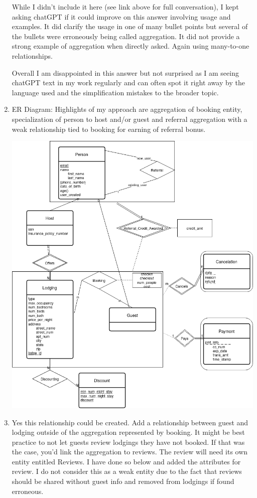 \documentclass[11pt]{article}
\begin{document}
\begin{enumerate}
While I didn't include it here (see link above for full conversation), I kept asking chatGPT if it could improve on this answer involving usage and examples.  It did clarify the usage in one of many bullet points but several of the bullets were erroneously being called aggregation.  It did not provide a strong example of aggregation when directly asked.  Again using many-to-one relationships.

Overall I am disappointed in this answer but not surprised as I am seeing chatGPT text in my work regularly and can often spot it right away by the language used and the simplification mistakes to the broader topic.

\item ER Diagram:  Highlights of my approach are aggregation of booking entity, specialization of person to host and/or guest and referral aggregation with a weak relationship tied to booking for earning of referral bonus.

\includegraphics[width = \textwidth]{question1.png}

\item Yes this relationship could be created.  Add a relationship between guest and lodging outside of the aggregation represented by booking.  It might be best practice to not let guests review lodgings they have not booked.  If that was the case, you'd link the aggregation to reviews.  The review will need its own entity entitled Reviews. I have done so below and added the attributes for review.  I do not consider this as a weak entity due to the fact that reviews should be shared without guest info and removed from lodgings if found erroneous.


\end{enumerate}
\end{document}
